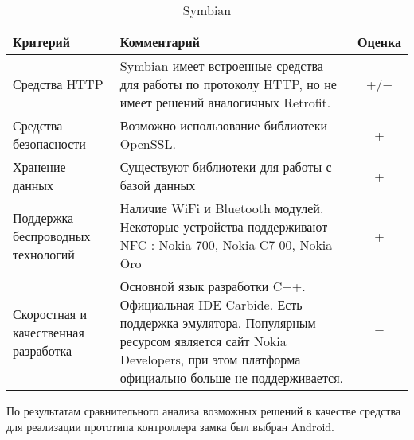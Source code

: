 \bgroup %
\def\arraystretch{1.5}%
  \begin{longtable}{| p{} | p{} | c |} 
  \caption{Symbian} %
  \hline
    Критерий & Комментарий & Оценка \\
  \hline
    Средства HTTP

    & Symbian имеет встроенные средства для работы по протоколу HTTP, но не имеет решений аналогичных Retrofit.
    & +/$-$\\
  \hline
    Средства безопасности

    & Возможно использование библиотеки OpenSSL.
    
    & + \\
  \hline
    Хранение данных

    & Существуют библиотеки для работы с базой данных 

    & + \\
  \hline
    Поддержка беспроводных технологий 
    
    & Наличие WiFi и Bluetooth модулей. Некоторые устройства поддерживают NFC : Nokia 700, Nokia C7-00, Nokia Oro

    & + \\
  \hline
    Скоростная и качественная разработка
    
    & Основной язык разработки C++. Официальная IDE Carbide. Есть поддержка эмулятора. Популярным ресурсом является сайт Nokia Developers, при этом платформа официально больше не поддерживается.

    & $-$ \\
  \hline

  \end{longtable}
\egroup %

По результатам сравнительного анализа возможных решений в качестве средства для реализации прототипа контроллера замка был выбран Android.

\clearpage
